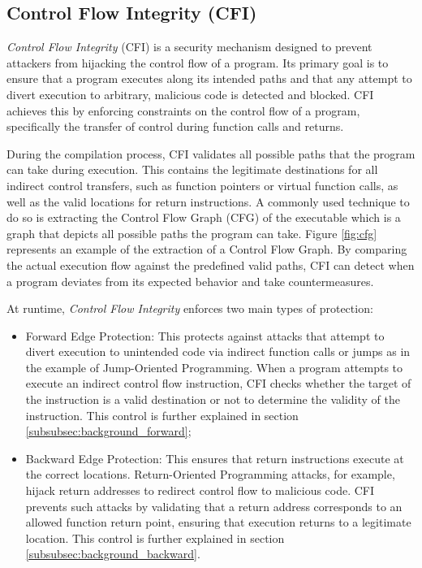 \subsection{Control Flow Integrity (CFI)}
\label{subsec:background_cfi}

\textit{Control Flow Integrity} (CFI) is a security mechanism designed to prevent
attackers from hijacking the control flow of a program. Its primary goal is to
ensure that a program executes along its intended paths and that any attempt to
divert execution to arbitrary, malicious code is detected and blocked. CFI
achieves this by enforcing constraints on the control flow of a program, specifically
the transfer of control during function calls and returns.

During the compilation process, CFI validates all possible paths that the
program can take during execution. This contains the legitimate destinations for
all indirect control transfers, such as function pointers or virtual function
calls, as well as the valid locations for return instructions. A commonly used
technique to do so is extracting the Control Flow Graph (CFG) of the executable
which is a graph that depicts all possible paths the program can take. Figure \ref{fig:cfg}
represents an example of the extraction of a Control Flow Graph. By comparing
the actual execution flow against the predefined valid paths, CFI can detect when
a program deviates from its expected behavior and take countermeasures.

At runtime, \textit{Control Flow Integrity} enforces two main types of protection:
\begin{itemize}
  \item Forward Edge Protection: This protects against attacks that attempt to
    divert execution to unintended code via indirect function calls or jumps as
    in the example of Jump-Oriented Programming. When a program attempts to execute
    an indirect control flow instruction, CFI checks whether the target of the
    instruction is a valid destination or not to determine the validity of the
    instruction. This control is further explained in section \ref{subsubsec:background_forward};

  \item Backward Edge Protection: This ensures that return instructions execute
    at the correct locations. Return-Oriented Programming attacks, for example, hijack
    return addresses to redirect control flow to malicious code. CFI prevents
    such attacks by validating that a return address corresponds to an allowed
    function return point, ensuring that execution returns to a legitimate location.
    This control is further explained in section
    \ref{subsubsec:background_backward}.
\end{itemize}

